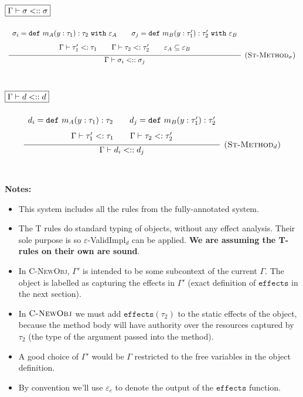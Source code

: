 \documentclass{llncs}
\newcommand{\keywadj}[1]{\mathtt{#1}}
\newcommand{\keyw}[1]{\keywadj{#1}~}
\newcommand{\kw}[1]{\keyw{ #1 }}
\newcommand{\kwa}[1]{\keywadj{ #1 }}
\newcommand{\type}[2]{
	#1~\keyw{with} #2
}
\begin{document}
\noindent
$\fbox{$\Gamma \vdash \sigma <:: \sigma$}$

\[
\begin{array}{c}

\infer[\textsc{(St-Method$_\sigma$)}]
	{ \Gamma \vdash \sigma_i <:: \sigma_j }
{{\def\arraystretch{1.6}
  \begin{array}{c}
\sigma_i = \kw{def} m_A(y : \tau_1) : \type{\tau_2}{\varepsilon_A}
~~~~~~\sigma_j = \kw{def} m_B(y : \tau_1') : \type{\tau_2'}{\varepsilon_B} \\
\Gamma \vdash \tau_1' <: \tau_1 ~~~~~~ \Gamma \vdash \tau_2 <: \tau_2' ~~~~~~ \varepsilon_A \subseteq \varepsilon_B
  \end{array}}} \\[5ex]
 
\end{array}
\]



\noindent
$\fbox{$\Gamma \vdash d <:: d$}$

\[
\begin{array}{c}

\infer[\textsc{(St-Method$_d$)}]
	{ \Gamma \vdash d_i <:: d_j }
{{\def\arraystretch{1.6}
  \begin{array}{c}
d_i = \kw{def} m_A(y : \tau_1) : \tau_2 ~~~~~~ d_j = \kw{def} m_B(y : \tau_1') : \tau_2' \\
\Gamma \vdash \tau_1' <: \tau_1 ~~~~~~ \Gamma \vdash \tau_2 <: \tau_2'
  \end{array}}} \\[5ex]

\end{array}
\]

\noindent \textbf{Notes:}

\begin{itemize}
	\item This system includes all the rules from the fully-annotated system.
	\item The \textsc{T} rules do standard typing of objects, without any effect analysis. Their sole purpose is so $\varepsilon$-ValidImpl$_d$ can be applied. \textbf{We are assuming the T-rules on their own are sound}.
	\item In \textsc{C-NewObj}, $\Gamma'$ is intended to be some subcontext of the current $\Gamma$. The object is labelled as capturing the effects in $\Gamma'$ (exact definition of $\kwa{effects}$ in the next section).
	\item In $\textsc{C-NewObj}$ we must add $\keywadj{effects}(\tau_2)$ to the static effects of the object, because the method body will have authority over the resources captured by $\tau_2$ (the type of the argument passed into the method).
	\item A good choice of $\Gamma'$ would be $\Gamma$ restricted to the free variables in the object definition.
	\item By convention we'll use $\varepsilon_c$ to denote the output of the $\keywadj{effects}$ function.
\end{itemize}
\end{document}
